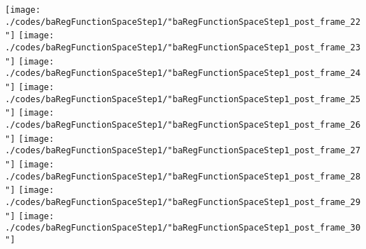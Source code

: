 \begin{frame}{\insertsection}
\begin{center}
{\begin{animateinline}{15}
				 \texttt{[image: ./codes/baRegFunctionSpaceStep1/"baRegFunctionSpaceStep1\_post\_frame\_22"]}\newframe
				 \texttt{[image: ./codes/baRegFunctionSpaceStep1/"baRegFunctionSpaceStep1\_post\_frame\_23"]}\newframe
				 \texttt{[image: ./codes/baRegFunctionSpaceStep1/"baRegFunctionSpaceStep1\_post\_frame\_24"]}\newframe
				 \texttt{[image: ./codes/baRegFunctionSpaceStep1/"baRegFunctionSpaceStep1\_post\_frame\_25"]}\newframe
				 \texttt{[image: ./codes/baRegFunctionSpaceStep1/"baRegFunctionSpaceStep1\_post\_frame\_26"]}\newframe
				 \texttt{[image: ./codes/baRegFunctionSpaceStep1/"baRegFunctionSpaceStep1\_post\_frame\_27"]}\newframe
				 \texttt{[image: ./codes/baRegFunctionSpaceStep1/"baRegFunctionSpaceStep1\_post\_frame\_28"]}\newframe
				 \texttt{[image: ./codes/baRegFunctionSpaceStep1/"baRegFunctionSpaceStep1\_post\_frame\_29"]}\newframe
				 \texttt{[image: ./codes/baRegFunctionSpaceStep1/"baRegFunctionSpaceStep1\_post\_frame\_30"]}
			 \end{animateinline}
			}
	\end{center}
    
\end{frame}


